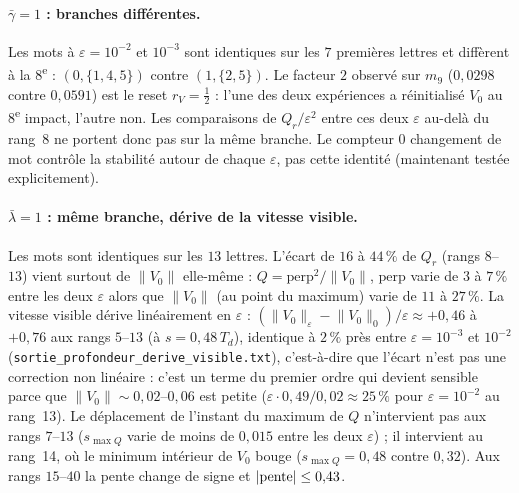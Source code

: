 \documentclass[11pt,a4paper]{article}
\theoremstyle{remark}
\newcommand{\norm}[1]{\lVert #1\rVert}
\begin{document}
\paragraph{$\bar\gamma=1$ : branches diff\'erentes.} Les mots \`a $\varepsilon=10^{-2}$ et $10^{-3}$ sont identiques sur les $7$ premi\`eres lettres et diff\`erent \`a la $8$\textsuperscript{e} : $(0,\{1,4,5\})$ contre $(1,\{2,5\})$. Le facteur $2$ observ\'e sur $m_9$ ($0{,}0298$ contre $0{,}0591$) est le reset $r_V=\frac12$ : l'une des deux exp\'eriences a r\'einitialis\'e $V_0$ au 8\textsuperscript{e} impact, l'autre non. Les comparaisons de $Q_r/\varepsilon^2$ entre ces deux $\varepsilon$ au-del\`a du rang~8 ne portent donc pas sur la m\^eme branche. Le compteur \og $0$ changement de mot \fg{} contr\^ole la stabilit\'e autour de chaque $\varepsilon$, pas cette identit\'e (maintenant test\'ee explicitement).

\paragraph{$\bar\lambda=1$ : m\^eme branche, d\'erive de la vitesse visible.} Les mots sont identiques sur les $13$ lettres. L'\'ecart de $16$ \`a $44\,\%$ de $Q_r$ (rangs $8$--$13$) vient surtout de $\norm{V_0}$ elle-m\^eme : $Q=\mathrm{perp}^2/\norm{V_0}$, $\mathrm{perp}$ varie de $3$ \`a $7\,\%$ entre les deux $\varepsilon$ alors que $\norm{V_0}$ (au point du maximum) varie de $11$ \`a $27\,\%$. La vitesse visible d\'erive lin\'eairement en $\varepsilon$ : $(\norm{V_0}_\varepsilon-\norm{V_0}_0)/\varepsilon\approx+0{,}46$ \`a $+0{,}76$ aux rangs $5$--$13$ (\`a $s=0{,}48\,T_d$), identique \`a $2\,\%$ pr\`es entre $\varepsilon=10^{-3}$ et $10^{-2}$ (\texttt{sortie\_profondeur\_derive\_visible.txt}), c'est-\`a-dire que l'\'ecart n'est pas une correction non lin\'eaire : c'est un terme du premier ordre qui devient sensible parce que $\norm{V_0}\sim0{,}02$--$0{,}06$ est petite ($\varepsilon\cdot0{,}49/0{,}02\approx25\,\%$ pour $\varepsilon=10^{-2}$ au rang~13). Le d\'eplacement de l'instant du maximum de $Q$ n'intervient pas aux rangs $7$--$13$ ($s_{\max Q}$ varie de moins de $0{,}015$ entre les deux $\varepsilon$) ; il intervient au rang~14, o\`u le minimum int\'erieur de $V_0$ bouge ($s_{\max Q}=0{,}48$ contre $0{,}32$). Aux rangs $15$--$40$ la pente change de signe et $|{\rm pente}|\le0{,}43$.
\end{document}
